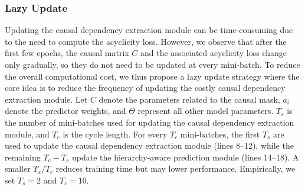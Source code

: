 \documentclass[sigconf, nonacm]{acmart}
\newcommand{\syadd}[1]{{\color{black}#1}}
\newcommand{\syfix}[1]{{\color{black}#1}}
\newcommand{\syne}[1]{{\color{black}#1}}
\newcommand{\vldb}[1]{{\color{red}#1}}
\begin{document}
\subsubsection{Lazy Update}

\syadd{Updating the causal dependency extraction module can be time-consuming due to the need to compute the \syfix{acyclicity} loss. 
\syfix{
However, we observe that after the first few epochs, the causal matrix $C$ and the associated acyclicity loss change only gradually, so they do not need to be updated at every mini-batch.} 
To reduce the overall computational cost, we thus propose a lazy update strategy where the core idea is to reduce the frequency of updating the costly causal dependency extraction module.} 
\syadd{Let $C$ denote the parameters related to the causal mask, \syfix{$a_i$ denote the predictor weights}, 
and $\Theta$ \syne{represent} all other model parameters.
$T_s$ is the number of mini-batches used for updating the causal dependency extraction module, and $T_c$ is the cycle length.} 
For every \syadd{$T_c$} mini-batches, the first $T_s$ are used to update the causal dependency extraction module \vldb{ (lines 8--12)}, while the remaining \syadd{$T_c - T_s$} update the \syadd{hierarchy-aware} prediction module \vldb{(lines 14--18)}. 
A smaller \syadd{$T_s/T_c$} reduces training time but may lower performance. Empirically, we set $T_s=2$ and \syadd{$T_c=10$}.
\end{document}
